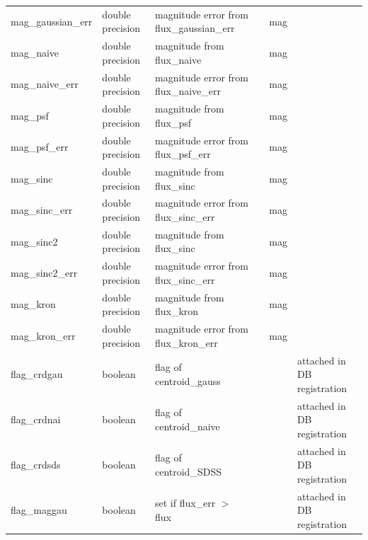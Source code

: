 \documentclass[12pt]{article}
\begin{document}
\begin{table}[thbp]
\begin{center}
{\begin{tabular}{llllll}
mag\_gaussian\_err & double precision & magnitude error from flux\_gaussian\_err                &                            & mag         &   \\
mag\_naive & double precision & magnitude from flux\_naive                           &                            & mag         &   \\
mag\_naive\_err & double precision & magnitude error from flux\_naive\_err                   &                            & mag         &   \\
mag\_psf & double precision & magnitude from flux\_psf                             &                            & mag         &   \\
mag\_psf\_err & double precision & magnitude error from flux\_psf\_err                     &                            & mag         &   \\
mag\_sinc & double precision & magnitude from flux\_sinc                            &                            & mag         &   \\
mag\_sinc\_err & double precision & magnitude error from flux\_sinc\_err                    &                            & mag         &   \\
mag\_sinc2 & double precision & magnitude from flux\_sinc                            &                            & mag         &   \\
mag\_sinc2\_err & double precision & magnitude error from flux\_sinc\_err                    &                            & mag         &   \\
mag\_kron & double precision & magnitude from flux\_kron                            &                            & mag         &   \\
mag\_kron\_err & double precision & magnitude error from flux\_kron\_err                    &                            & mag         &   \\
flag\_crdgau & boolean & flag of centroid\_gauss                              &                            &             & attached in DB registration  \\
flag\_crdnai & boolean & flag of centroid\_naive                              &                            &             & attached in DB registration  \\
flag\_crdsds & boolean & flag of centroid\_SDSS                               &                            &             & attached in DB registration  \\
flag\_maggau & boolean & set if flux\_err $>$ flux                              &                            &             & attached in DB registration  \\

\end{tabular}}
\end{center}
\end{table}
\end{document}
